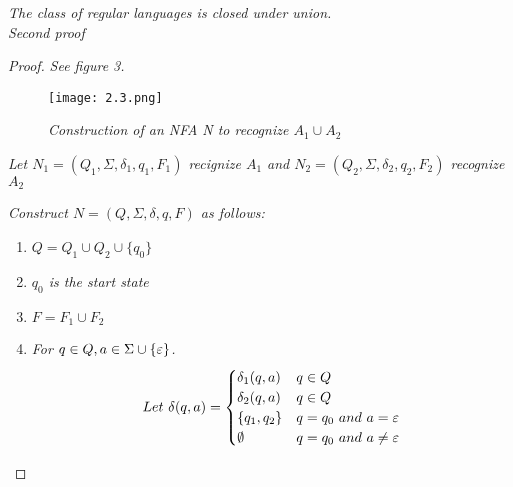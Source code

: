 \documentclass{article}
\begin{document}
\newpage
\setcounter{defn}{4}
\begin{thm}
    \textit{The class of regular languages is closed under union.\\Second proof }

    \begin{proof}
        \textit{See figure 3.}
        \begin{figure}
            \centering
            \texttt{[image: 2.3.png]}
            \caption{\textit{Construction of an NFA N to recognize $A_1 \cup A_2$}}
        \end{figure}

        \textit{Let $N_1 = (Q_1,\Sigma,\delta_1,q_1,F_1)$ recignize $A_1$ and $N_2 = (Q_2,\Sigma,\delta_2,q_2,F_2)$ recognize $A_2$}

        \textit{Construct $N = (Q,\Sigma,\delta,q,F)$ as follows:}

        \begin{enumerate}
            \item $Q = Q_1\cup Q_2\cup \{q_0\}$
            \item \textit{$q_0$ is the start state}
            \item $F = F_1\cup F_2$
            \item \textit{For $q\in Q,a\in \Sigma\cup\{\varepsilon\}$.}
            \[ 
                Let ~ \delta(q,a) = 
                \begin{cases}
                    \delta_1(q,a) & q\in Q \\
                    \delta_2(q,a) & q\in Q \\
                    \{q_1,q_2\} & q = q_0 ~ and ~ a = \varepsilon \\
                    \emptyset & q = q_0 ~ and ~ a \neq \varepsilon \\
                \end{cases}
            \]
        \end{enumerate}
    \end{proof}
\end{thm}
\end{document}
